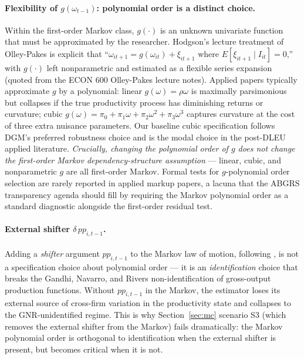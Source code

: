 \documentclass[11pt]{article}
\begin{document}
\paragraph{Flexibility of $g(\omega_{t-1})$: polynomial order is a distinct choice.} Within the first-order Markov class, $g(\cdot)$ is an unknown univariate function that must be approximated by the researcher. Hodgson's lecture treatment of Olley-Pakes is explicit that ``$\omega_{it+1} = g(\omega_{it}) + \xi_{it+1}$ where $E[\xi_{it+1} \mid I_{it}] = 0$,'' with $g(\cdot)$ left nonparametric and estimated as a flexible series expansion (quoted from the ECON 600 Olley-Pakes lecture notes). Applied papers typically approximate $g$ by a polynomial: linear $g(\omega) = \rho\omega$ is maximally parsimonious but collapses if the true productivity process has diminishing returns or curvature; cubic $g(\omega) = \pi_0 + \pi_1\omega + \pi_2\omega^2 + \pi_3\omega^3$ captures curvature at the cost of three extra nuisance parameters. Our baseline cubic specification follows DGM's \cite{DGM2026} preferred robustness choice and is the modal choice in the post-DLEU applied literature. \emph{Crucially, changing the polynomial order of $g$ does not change the first-order Markov dependency-structure assumption} --- linear, cubic, and nonparametric $g$ are all first-order Markov. Formal tests for $g$-polynomial order selection are rarely reported in applied markup papers, a lacuna that the ABGRS transparency agenda should fill by requiring the Markov polynomial order as a standard diagnostic alongside the first-order residual test.

\paragraph{External shifter $\delta\, pp_{i,t-1}$.} Adding a \emph{shifter} argument $pp_{i,t-1}$ to the Markov law of motion, following \citet{DeLoecker2013}, is not a specification choice about polynomial order --- it is an \emph{identification} choice that breaks the Gandhi, Navarro, and Rivers \cite{GNR2020} non-identification of gross-output production functions. Without $pp_{i,t-1}$ in the Markov, the estimator loses its external source of cross-firm variation in the productivity state and collapses to the GNR-unidentified regime. This is why Section~\ref{sec:mc} scenario S3 (which removes the external shifter from the Markov) fails dramatically: the Markov polynomial order is orthogonal to identification when the external shifter is present, but becomes critical when it is not.
\end{document}
